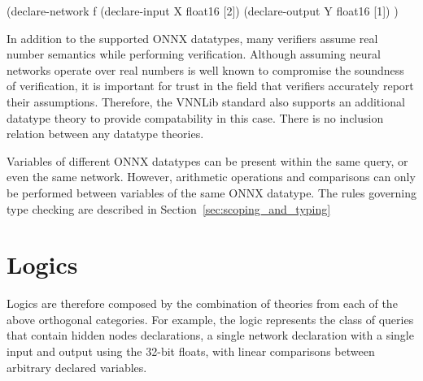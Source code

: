 \begin{code}[style=lbnf]
(declare-network f
    (declare-input  X float16 [2])
    (declare-output Y float16 [1])
)
\end{code}

In addition to the supported ONNX datatypes, many verifiers assume real number semantics while performing verification. Although assuming neural networks operate over real numbers is well known to compromise the soundness of verification, it is important for trust in the field that verifiers accurately report their assumptions. Therefore, the VNNLib standard also supports an additional datatype theory  to provide compatability in this case.  There is no inclusion relation between any datatype theories.

Variables of different ONNX datatypes can be present within the same query, or even the same network. However, arithmetic operations and comparisons can only be performed between variables of the same ONNX datatype.
The rules governing type checking are described in Section~\ref{sec:scoping_and_typing}

\section{Logics}

Logics are therefore composed by the combination of theories from each of the above orthogonal categories. For example, the logic  represents the class of queries that contain hidden nodes declarations, a single network declaration with a single input and output using the 32-bit floats, with linear comparisons between arbitrary declared variables.

